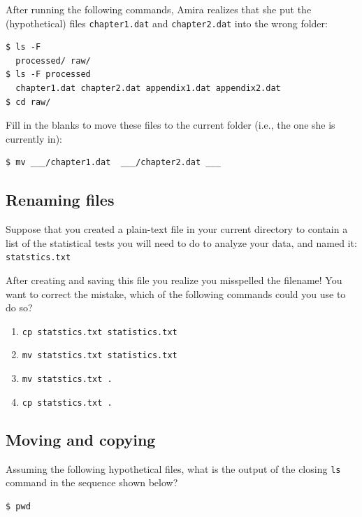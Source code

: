 \documentclass[
]{krantz}
\providecommand{\tightlist}{%
  \setlength{\itemsep}{0pt}\setlength{\parskip}{0pt}}
\begin{document}
After running the following commands,
Amira realizes that she put the (hypothetical) files \texttt{chapter1.dat} and \texttt{chapter2.dat} into the wrong folder:

\begin{verbatim}
$ ls -F
  processed/ raw/
$ ls -F processed
  chapter1.dat chapter2.dat appendix1.dat appendix2.dat
$ cd raw/
\end{verbatim}

Fill in the blanks to move these files to the current folder
(i.e., the one she is currently in):

\begin{verbatim}
$ mv ___/chapter1.dat  ___/chapter2.dat ___
\end{verbatim}

\hypertarget{bash-basics-ex-renaming-files}{%
\subsection{Renaming files}\label{bash-basics-ex-renaming-files}}

Suppose that you created a plain-text file in your current directory to contain a list of the
statistical tests you will need to do to analyze your data, and named it: \texttt{statstics.txt}

After creating and saving this file you realize you misspelled the filename! You want to
correct the mistake, which of the following commands could you use to do so?

\begin{enumerate}
\def\labelenumi{\arabic{enumi}.}
\tightlist
\item
  \texttt{cp\ statstics.txt\ statistics.txt}
\item
  \texttt{mv\ statstics.txt\ statistics.txt}
\item
  \texttt{mv\ statstics.txt\ .}
\item
  \texttt{cp\ statstics.txt\ .}
\end{enumerate}

\hypertarget{bash-basics-ex-last-ls}{%
\subsection{Moving and copying}\label{bash-basics-ex-last-ls}}

Assuming the following hypothetical files,
what is the output of the closing \texttt{ls} command in the sequence shown below?

\begin{verbatim}
$ pwd
\end{verbatim}
\end{document}
